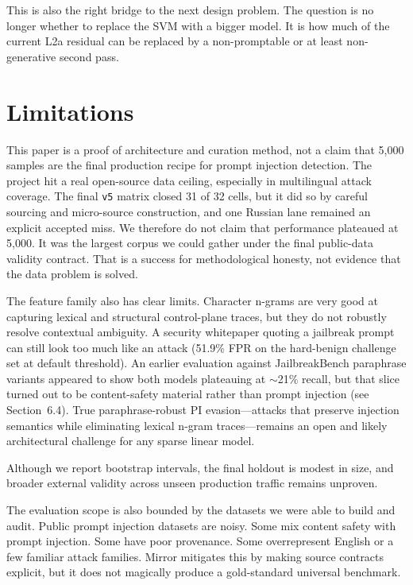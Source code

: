 \documentclass[11pt,a4paper]{article}
\begin{document}
This is also the right bridge to the next design problem. The question
is no longer whether to replace the SVM with a bigger model. It is how
much of the current L2a residual can be replaced by a non-promptable or
at least non-generative second pass.

\section{Limitations}
\label{sec:limitations}

This paper is a proof of architecture and curation method, not a claim
that 5,000 samples are the final production recipe for prompt injection
detection. The project hit a real open-source data ceiling, especially
in multilingual attack coverage. The final \texttt{v5} matrix closed 31
of 32 cells, but it did so by careful sourcing and micro-source
construction, and one Russian lane remained an explicit accepted miss.
We therefore do not claim that performance plateaued at 5,000. It was
the largest corpus we could gather under the final public-data validity
contract. That is a success for methodological honesty, not evidence
that the data problem is solved.

The feature family also has clear limits. Character n-grams are very
good at capturing lexical and structural control-plane traces, but they
do not robustly resolve contextual ambiguity. A security whitepaper
quoting a jailbreak prompt can still look too much like an attack
(51.9\% FPR on the hard-benign challenge set at default threshold).
An earlier evaluation against JailbreakBench paraphrase variants
appeared to show both models plateauing at $\sim$21\% recall, but that
slice turned out to be content-safety material rather than prompt
injection (see Section~6.4). True paraphrase-robust PI evasion---attacks
that preserve injection semantics while eliminating lexical n-gram
traces---remains an open and likely architectural challenge for any
sparse linear model.

Although we report bootstrap intervals, the final holdout is modest in
size, and broader external validity across unseen production traffic
remains unproven.

The evaluation scope is also bounded by the datasets we were able to
build and audit. Public prompt injection datasets are noisy. Some mix
content safety with prompt injection. Some have poor provenance. Some
overrepresent English or a few familiar attack families. Mirror
mitigates this by making source contracts explicit, but it does not
magically produce a gold-standard universal benchmark.
\end{document}
